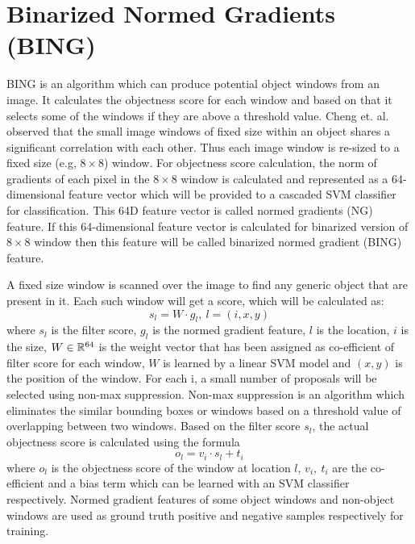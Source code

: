 \section{Binarized Normed Gradients (BING)}
BING \cite{b2} is an algorithm which can produce potential object windows from an image. It calculates the objectness score for each window and based on that it selects some of the windows if they are above a threshold value. Cheng et. al. \cite{b2} observed that the small image windows of fixed size within an object shares a significant correlation with each other. Thus each image window is re-sized to a fixed size (e.g, $8\times 8$) window. For objectness score calculation, the norm of gradients of each pixel in the $8\times 8$ window is calculated and represented as a 64-dimensional feature vector which will be provided to a cascaded SVM classifier for classification. This 64D feature vector is called normed gradients (NG) feature. If this 64-dimensional feature vector is calculated for binarized version of $8\times 8$ window then this feature will be called binarized normed gradient (BING) feature. 
\par A fixed size window is scanned over the image to find any generic object that are present in it. Each such window will get a score, which will be calculated as: 
$$s_l=W\cdot g_l,\ l=(i,x,y)$$ where $s_l$ is the filter score, $g_l$ is the normed gradient feature, $l$ is the location, $i$ is the size, $W\in \mathbb{R}^{64}$ is the weight vector that has been assigned as co-efficient of filter score for each window, $W$ is learned by a linear SVM model and $(x,y)$ is the position of the window. For each i, a small number of proposals will be selected using non-max suppression. Non-max suppression is an algorithm which eliminates the similar bounding boxes or windows based on a threshold value of overlapping between two windows. Based on the filter score $s_l$, the actual objectness score is calculated using the formula $$o_l=v_i\cdot s_l+t_i$$ where $o_l$ is the objectness score of the window at location $l$, $v_i,\ t_i$ are the co-efficient and a bias term which can be learned with an SVM classifier respectively. Normed gradient features of some object windows and non-object windows are used as ground truth positive and negative samples respectively for training.  

